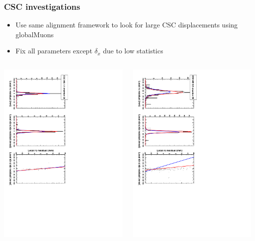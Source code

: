 \documentclass[compress]{beamer}
\begin{document}
\begin{frame}
\frametitle{CSC investigations}

\begin{itemize}
\item Use same alignment framework to look for large CSC displacements using globalMuons
\item Fix all parameters except $\delta_x$ due to low statistics
\end{itemize}

\begin{columns}
\includegraphics[height=\linewidth, angle=90]{datafit_csc_me11.pdf}

\includegraphics[height=\linewidth, angle=90]{datafit_csc_me22.pdf}


\end{columns}
\end{frame}
\end{document}
